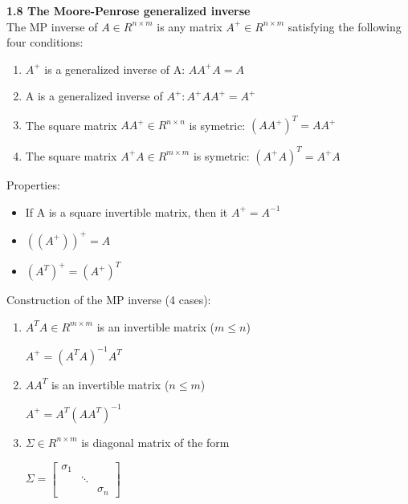 \documentclass{article}
\begin{document}
\begin{multicols}{2}
\textbf{1.8 The Moore-Penrose generalized inverse}\\
The MP inverse of $A \in R^{n \times m}$ is any matrix 
$A^+ \in R^{n \times m}$ satisfying the following four conditions:
\begin{enumerate}
    \item $A^+$ is a generalized inverse of A: $AA^+A = A$
    \item A is a generalized inverse of $A^+: A^+AA^+ = A^+$
    \item The square matrix $AA^+ \in R^{n \times n}$ is symetric: $(AA^+)^T = AA^+$
    \item The square matrix $A^+A \in R^{m \times m}$ is symetric: $(A^+A)^T = A^+A$
\end{enumerate}
Properties:
\begin{itemize}
    \item If A is a square invertible matrix, then it $A^+ = A^{-1}$
    \item $((A^+))^+ = A$
    \item $(A^T)^+ = (A^+)^T$
\end{itemize}
Construction of the MP inverse (4 cases):
\begin{enumerate}
    \item $A^TA \in R^{m \times m}$ is an invertible matrix ($m \leq n$)
        \begin{center}
            \begin{math}
                A^+ = (A^TA)^{-1}A^T
            \end{math}
        \end{center}
    \item $AA^T$ is an invertible matrix ($n \leq m$)
        \begin{center}
            \begin{math}
                A^+ = A^T(AA^T)^{-1} 
            \end{math}
        \end{center}
    \item $\Sigma \in R^{n \times m}$ is diagonal matrix of the form
        \begin{center}
            \begin{math}
                \Sigma =
                \begin{bmatrix}
                    \sigma_1 &        & \\
                             & \ddots & \\
                             &        & \sigma_n
                \end{bmatrix}

\end{math}
\end{center}
\end{enumerate}
\end{multicols}
\end{document}
